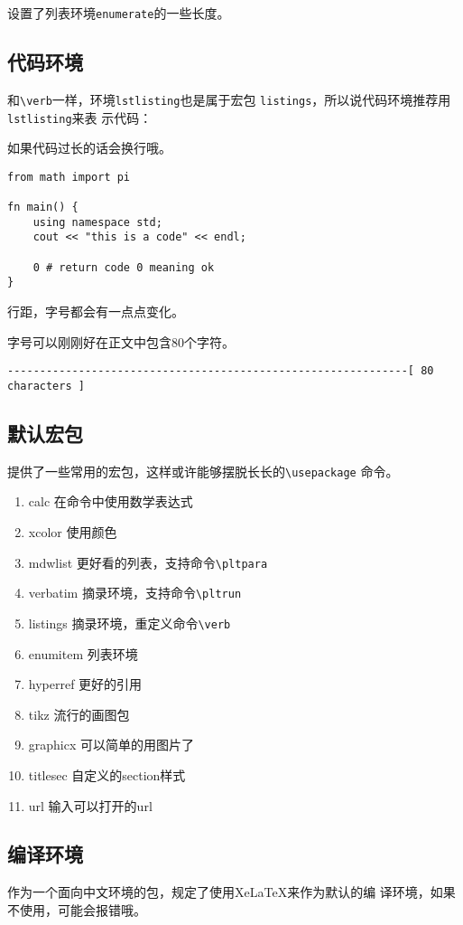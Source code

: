 \documentclass{peterlitsdoc}
\newcommand{\vb}{\verb}
\begin{document}
设置了列表环境\vb|enumerate|的一些长度。


\subsection{代码环境}

和\verb|\verb|一样，环境\vb|lstlisting|也是属于宏包
\vb|listings|，所以说代码环境推荐用\vb|lstlisting|来表
示代码：

\begin{pltrun}
如果代码过长的话会换行哦。
\begin{lstlisting}
from math import pi

fn main() {
    using namespace std;
    cout << "this is a code" << endl;

    0 # return code 0 meaning ok
}
\end{lstlisting}

行距，字号都会有一点点变化。
\end{pltrun}

字号可以刚刚好在正文中包含80个字符。
\begin{lstlisting}
--------------------------------------------------------------[ 80 characters ]
\end{lstlisting}


\subsection{默认宏包}

提供了一些常用的宏包，这样或许能够摆脱长长的\vb|\usepackage|
命令。

\begin{enumerate}
    \item calc          \hfill 在命令中使用数学表达式
    \item xcolor        \hfill 使用颜色
    \item mdwlist
          \hfill 更好看的列表，支持命令\vb|\pltpara|
    \item verbatim      \hfill 摘录环境，支持命令\vb|\pltrun|
    \item listings      \hfill 摘录环境，重定义命令\verb|\verb|
    \item enumitem      \hfill 列表环境
    \item hyperref      \hfill 更好的引用
    \item tikz          \hfill 流行的画图包
    \item graphicx      \hfill 可以简单的用图片了
    \item titlesec      \hfill 自定义的section样式
    \item url           \hfill 输入可以打开的url
\end{enumerate}


\subsection{编译环境}

作为一个面向中文环境的包，规定了使用XeLaTeX来作为默认的编
译环境，如果不使用，可能会报错哦。


\end{document}
